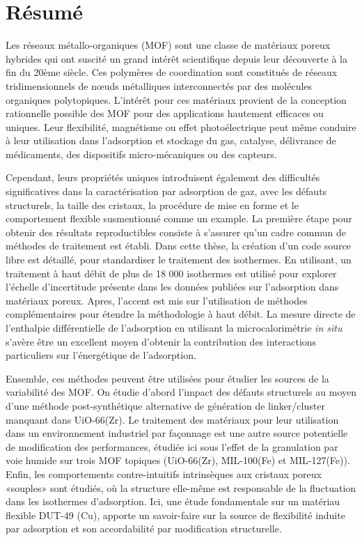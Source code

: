 \pagebreak

\chapter{Résumé}

Les réseaux métallo-organiques (MOF) sont une classe de matériaux poreux
hybrides qui ont suscité un grand intérêt scientifique depuis leur 
découverte à la fin du 20ème siècle. Ces polymères de coordination sont 
constitués de réseaux tridimensionnels de nœuds métalliques interconnectés 
par des molécules organiques polytopiques. L'intérêt pour ces matériaux 
provient de la conception rationnelle possible des MOF pour des 
applications hautement efficaces ou uniques.
Leur flexibilité, magnétisme ou effet photoélectrique
peut même conduire à leur utilisation dans l'adsorption et stockage du
gas, catalyse, délivrance de médicaments, des dispositifs micro-mécaniques
ou des capteurs.

Cependant, leurs propriétés uniques introduisent également des difficultés
significatives dans la caractérisation par adsorption de gaz, avec les 
défauts structurels, la taille des cristaux, la procédure de mise 
en forme et le comportement flexible susmentionné comme un example. 
La première étape pour obtenir des résultats reproductibles consiste 
à s'assurer qu'un cadre commun de méthodes de traitement 
est établi. Dans cette thèse, la création d'un code source 
libre est détaillé, 
pour standardiser le traitement des isothermes. En utilisant, 
un traitement à haut débit de plus de 18 000 isothermes est 
utilisé pour explorer l'échelle d'incertitude présente dans les 
données publiées sur l'adsorption dans matériaux poreux.
Apres, l'accent est mis sur l'utilisation de méthodes complémentaires 
pour étendre la méthodologie à haut débit. La mesure directe de 
l'enthalpie différentielle de l'adsorption en utilisant la
microcalorimétrie \textit{in situ} s'avère être un excellent 
moyen d'obtenir la contribution des interactions particuliers sur
l'énergétique de l'adsorption.

Ensemble, ces méthodes peuvent être utilisées pour étudier les sources 
de la variabilité des MOF. On étudie d’abord l’impact des défauts
structurels au moyen d’une méthode post-synthétique alternative de
génération de linker/cluster manquant dans UiO-66(Zr). 
Le traitement des matériaux pour leur utilisation dans 
un environnement industriel par façonnage est une autre source
potentielle de modification des performances, étudiée ici sous l’effet de la granulation par 
voie humide sur trois MOF topiques (UiO-66(Zr), MIL-100(Fe) 
et MIL-127(Fe)). 
Enfin, les comportements contre-intuitifs intrinsèques aux cristaux poreux 
«souples» sont étudiés, où la structure elle-même est responsable de la 
fluctuation dans les isothermes d'adsorption. Ici, une étude 
fondamentale sur un matériau flexible DUT-49 (Cu), apporte un 
savoir-faire sur la source de
flexibilité induite par adsorption et son accordabilité 
par modification structurelle.
